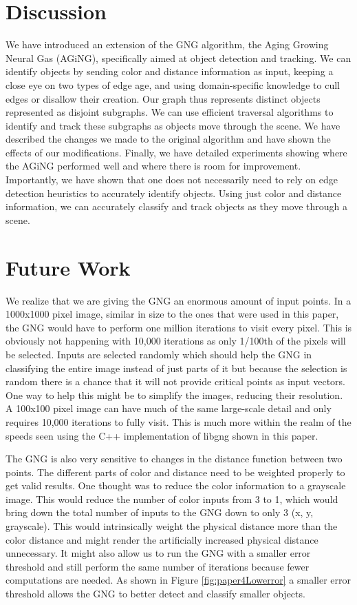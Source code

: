 \documentclass{article}
\renewcommand{\|}{\origbar} %
\begin{document}
\section{Discussion}
\label{sec:discussion}

We have introduced an extension of the GNG algorithm, the Aging Growing Neural Gas (AGiNG), specifically aimed at  object detection and tracking. We can identify objects by sending color and distance information as input, keeping a close eye on two types of edge age, and using domain-specific knowledge to cull edges or disallow their creation. Our graph thus represents distinct objects represented as disjoint subgraphs. We can use efficient traversal algorithms to identify and track these subgraphs as objects move through the scene. We have described the changes we made to the original algorithm and have shown the effects of our modifications. Finally, we have detailed experiments showing where the AGiNG performed well and where there is room for improvement. Importantly, we have shown that one does not necessarily need to rely on edge detection heuristics to accurately identify objects. Using just color and distance information, we can accurately classify and track objects as they move through a scene.

\section{Future Work}
\label{sec:future}

We realize that we are giving the GNG an enormous amount of input points. In a 1000x1000 pixel image, similar in size to the ones that were used in this paper, the GNG would have to perform one million iterations to visit every pixel. This is obviously not happening with 10,000 iterations as only 1/100th of the pixels will be selected. Inputs are selected randomly which should help the GNG in classifying the entire image instead of just parts of it but because the selection is random there is a chance that it will not provide critical points as input vectors. One way to help this might be to simplify the images, reducing their resolution. A 100x100 pixel image can have much of the same large-scale detail and only requires 10,000 iterations to fully visit. This is much more within the realm of the speeds seen using the C++ implementation of libgng shown in this paper.

The GNG is also very sensitive to changes in the distance function between two points. The different parts of color and distance need to be weighted properly to get valid results. One thought was to reduce the color information to a grayscale image. This would reduce the number of color inputs from 3 to 1, which would bring down the total number of inputs to the GNG down to only 3 (x, y, grayscale). This would intrinsically weight the physical distance more than the color distance and might render the artificially increased physical distance unnecessary. It might also allow us to run the GNG with a smaller error threshold and still perform the same number of iterations because fewer computations are needed. As shown in Figure \ref{fig:paper4Lowerror} a smaller error threshold allows the GNG to better detect and classify smaller objects.
\end{document}
